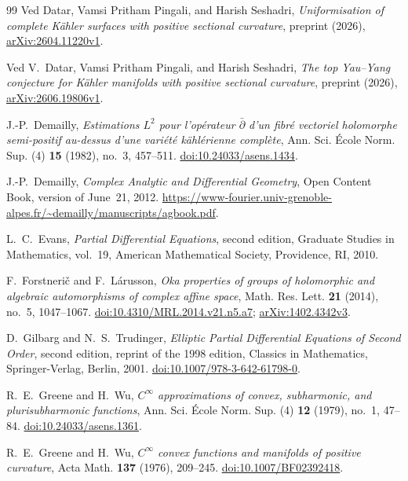 \begin{thebibliography}{99}
Ved Datar, Vamsi Pritham Pingali, and Harish Seshadri,
\emph{Uniformisation of complete K\"ahler surfaces with positive
sectional curvature},
preprint (2026),
\href{https://arxiv.org/abs/2604.11220v1}{arXiv:2604.11220v1}.

Ved V.~Datar, Vamsi Pritham Pingali, and Harish Seshadri,
\emph{The top Yau--Yang conjecture for K\"ahler manifolds with positive
sectional curvature},
preprint (2026),
\href{https://arxiv.org/abs/2606.19806v1}{arXiv:2606.19806v1}.

J.-P.~Demailly,
\emph{Estimations $L^2$ pour l'op\'erateur $\bar\partial$ d'un
fibr\'e vectoriel holomorphe semi-positif au-dessus d'une vari\'et\'e
k\"ahl\'erienne compl\`ete},
Ann. Sci. \'Ecole Norm. Sup. (4) \textbf{15} (1982), no.~3, 457--511.
\href{https://doi.org/10.24033/asens.1434}{doi:10.24033/asens.1434}.

J.-P.~Demailly,
\emph{Complex Analytic and Differential Geometry},
Open Content Book, version of June~21, 2012.
\url{https://www-fourier.univ-grenoble-alpes.fr/~demailly/manuscripts/agbook.pdf}.

L.~C.~Evans,
\emph{Partial Differential Equations}, second edition,
Graduate Studies in Mathematics, vol.~19,
American Mathematical Society, Providence, RI, 2010.

F.~Forstneri\v{c} and F.~L\'arusson,
\emph{Oka properties of groups of holomorphic and algebraic
automorphisms of complex affine space},
Math. Res. Lett. \textbf{21} (2014), no.~5, 1047--1067.
\href{https://doi.org/10.4310/MRL.2014.v21.n5.a7}
{doi:10.4310/MRL.2014.v21.n5.a7};
\href{https://arxiv.org/abs/1402.4342v3}{arXiv:1402.4342v3}.

D.~Gilbarg and N.~S.~Trudinger,
\emph{Elliptic Partial Differential Equations of Second Order},
second edition, reprint of the 1998 edition,
Classics in Mathematics, Springer-Verlag, Berlin, 2001.
\href{https://doi.org/10.1007/978-3-642-61798-0}
{doi:10.1007/978-3-642-61798-0}.

R.~E.~Greene and H.~Wu,
\emph{$C^\infty$ approximations of convex, subharmonic, and
plurisubharmonic functions},
Ann. Sci. \'Ecole Norm. Sup. (4) \textbf{12} (1979), no.~1, 47--84.
\href{https://doi.org/10.24033/asens.1361}{doi:10.24033/asens.1361}.

R.~E.~Greene and H.~Wu,
\emph{$C^\infty$ convex functions and manifolds of positive curvature},
Acta Math. \textbf{137} (1976), 209--245.
\href{https://doi.org/10.1007/BF02392418}{doi:10.1007/BF02392418}.


\end{thebibliography}
